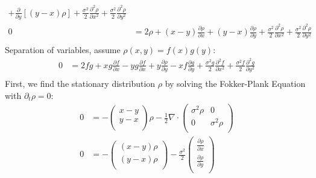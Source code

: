 \documentclass[12pt]{article}
\theoremstyle{plain}
\theoremstyle{definition}
\theoremstyle{remark}
\begin{document}
\begin{enumerate}
\begin{enumerate}
\begin{align*}
          +
          \frac{\partial}{\partial y}[(y-x)\rho]
          +
          \frac{\sigma^2 }{2}
            \frac{\partial^2 \rho}{\partial x^2}
          +
          \frac{\sigma^2 }{2}
            \frac{\partial^2 \rho}{\partial y^2}\\
          0 &=
          2\rho + (x-y)\frac{\partial\rho}{\partial x}
          + (y-x)\frac{\partial\rho}{\partial y}
          + \frac{\sigma^2 }{2} \frac{\partial^2 \rho}{\partial x^2}
          + \frac{\sigma^2 }{2} \frac{\partial^2 \rho}{\partial y^2}\\
        \end{align*}
        Separation of variables, assume $\rho(x,y) = f(x) g(y)$:
        \begin{align*}
          0 &=
          2fg + xg\frac{\partial f}{\partial x}
          -yg\frac{\partial f}{\partial x}
          + y\frac{\partial\rho}{\partial y}
          -xf\frac{\partial g}{\partial y}
          + \frac{\sigma^2 g}{2} \frac{\partial^2 f}{\partial x^2}
          + \frac{\sigma^2 f}{2} \frac{\partial^2 g}{\partial y^2}\\
        \end{align*}
        First, we find the stationary distribution $\rho$ by solving the
        Fokker-Plank Equation with $\partial_t \rho=0$:
        \begin{align*}
          0 &=
          -\begin{pmatrix}
            x-y\\
            y-x\\
          \end{pmatrix}\rho
          - \frac{1}{2} \nabla \cdot
          \begin{pmatrix}
            \sigma^2 \rho & 0 \\
            0 & \sigma^2 \rho\\
          \end{pmatrix}
          \\
          0&=
          -\begin{pmatrix}
            (x-y)\rho\\
            (y-x)\rho\\
          \end{pmatrix}
          - \frac{\sigma^2 }{2}
          \begin{pmatrix}
            \frac{\partial \rho}{\partial x} \\
            \frac{\partial \rho}{\partial y} \\
          \end{pmatrix}

\end{align*}
\end{enumerate}
\end{enumerate}
\end{document}
